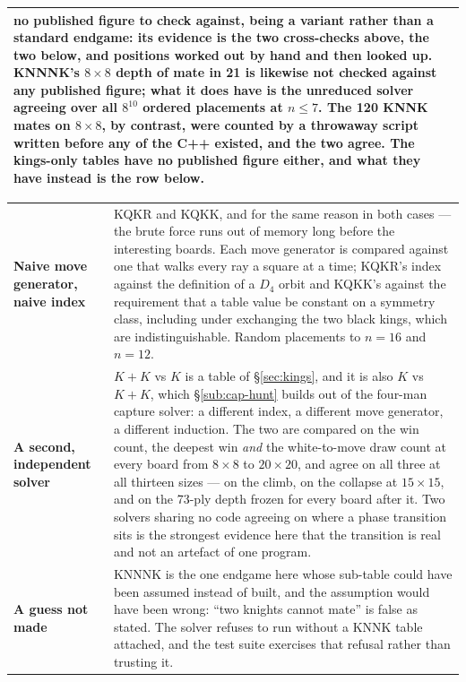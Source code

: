 \documentclass[11pt]{article}
\begin{document}
\begin{center}
\begin{tabular}{@{}lp{}@{}}
{no published figure to check against}, being a variant rather than a standard
endgame: its evidence is the two cross-checks above, the two below, and
positions worked out by hand and then looked up. \textbf{KNNNK's $8\times8$
depth of mate in 21 is likewise not checked against any published figure}; what
it does have is the unreduced solver agreeing over all $8^{10}$ ordered
placements at $n \le 7$. The 120 KNNK mates on $8\times8$, by contrast, were
counted by a throwaway script written before any of the C++ existed, and the
two agree. \textbf{The kings-only tables have no published figure either}, and
what they have instead is the row below. \\
\bottomrule
\end{tabular}
\end{center}

\begin{center}\small
\begin{tabular}{@{}lp{}@{}}
\toprule
\textbf{Naive move generator, naive index} & KQKR and KQKK, and for the same
reason in both cases --- the brute force runs out of memory long before the
interesting boards. Each move generator is compared against one that walks
every ray a square at a time; KQKR's index against the definition of a $D_4$
orbit and KQKK's against the requirement that a table value be constant on a
symmetry class, including under exchanging the two black kings, which are
indistinguishable. Random placements to $n=16$ and $n=12$. \\[2mm]
\textbf{A second, independent solver} & $K\!+\!K$ vs $K$ is a table of
\S\ref{sec:kings}, and it is also $K$ vs $K\!+\!K$, which \S\ref{sub:cap-hunt}
builds out of the four-man capture solver: a different index, a different move
generator, a different induction. The two are compared on the win count, the
deepest win \emph{and} the white-to-move draw count at every board from
$8\times8$ to $20\times20$, and agree on all three at all thirteen sizes --- on
the climb, on the collapse at $15\times15$, and on the 73-ply depth frozen for
every board after it. Two solvers sharing no code agreeing on where a phase
transition sits is the strongest evidence here that the transition is real and
not an artefact of one program. \\[2mm]
\textbf{A guess not made} & KNNNK is the one endgame here whose sub-table could
have been assumed instead of built, and the assumption would have been wrong:
``two knights cannot mate'' is false as stated. The solver refuses to run
without a KNNK table attached, and the test suite exercises that refusal rather
than trusting it. \\
\bottomrule
\end{tabular}
\end{center}
\end{document}
